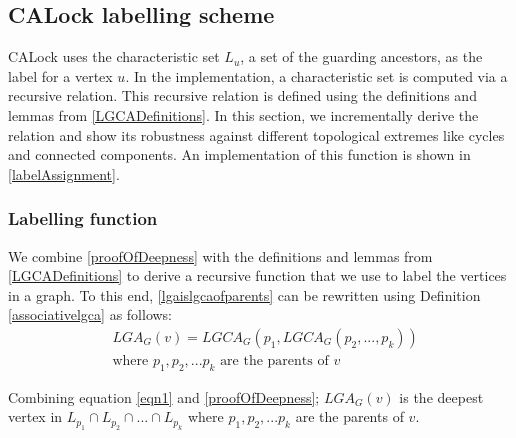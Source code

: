 \subsection{CALock labelling scheme} \label{sec:labellingScheme}
CALock uses the characteristic set $L_u$, a set of the guarding ancestors, as the label for a vertex $u$.  
In the implementation, a characteristic set is computed via a recursive relation. 
This recursive relation is defined using the definitions and lemmas from \cref{LGCADefinitions}. 
In this section, we incrementally derive the relation and show its robustness against different topological extremes like cycles and connected components.  
An implementation of this function is shown in \cref{labelAssignment}.


\subsubsection{Labelling function} \label{sec:recursivelabellingfunction}

We combine \cref{proofOfDeepness} with the definitions and lemmas from \cref{LGCADefinitions} to derive a recursive function that we use to label the vertices in a graph. To this end,
\cref{lgaislgcaofparents} can be rewritten using Definition \cref{associativelgca} as follows:
\begin{equation}\label{eqn1}
\begin{split}
    &{LGA_G(v) = LGCA_G (p_1, LGCA_G (p_2,...,p_k))}
    \\ &\text{where } p_1, p_2, ... p_k \text{ are the parents of } v
\end{split}
\end{equation}


Combining equation \cref{eqn1} and \cref{proofOfDeepness}; $LGA_G(v)$ is the deepest vertex in $ L_{p_1} \cap L_{p_2} \cap ... \cap L_{p_k}$ where $p_1, p_2, ... p_k$ are the parents of $v$.

